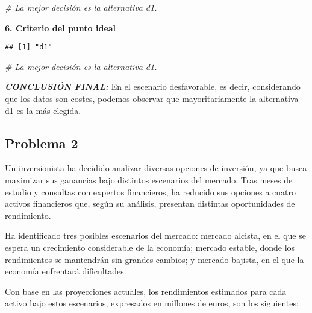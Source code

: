 \documentclass[
]{article}
\newenvironment{Shaded}{\begin{snugshade}}{\end{snugshade}}
\newcommand{\CommentTok}[1]{\textcolor[rgb]{0.56,0.35,0.01}{\textit{#1}}}
\newcommand{\FunctionTok}[1]{\textcolor[rgb]{0.13,0.29,0.53}{\textbf{#1}}}
\newcommand{\NormalTok}[1]{#1}
\newcommand{\OtherTok}[1]{\textcolor[rgb]{0.56,0.35,0.01}{#1}}
\newcommand{\SpecialCharTok}[1]{\textcolor[rgb]{0.81,0.36,0.00}{\textbf{#1}}}
\begin{document}
\begin{Shaded}
\begin{Highlighting}[]
\CommentTok{\# La mejor decisión es la alternativa d1.}
\end{Highlighting}
\end{Shaded}

\textbf{6. Criterio del punto ideal}

\begin{Shaded}
\end{Shaded}

\begin{verbatim}
## [1] "d1"
\end{verbatim}

\begin{Shaded}
\begin{Highlighting}[]
\CommentTok{\# La mejor decisión es la alternativa d1.}
\end{Highlighting}
\end{Shaded}

\textbf{\emph{CONCLUSIÓN FINAL:}} En el escenario desfavorable, es
decir, considerando que los datos son costes, podemos observar que
mayoritariamente la alternativa d1 es la más elegida.

\subsection{Problema 2}\label{problema-2-2}

Un inversionista ha decidido analizar diversas opciones de inversión, ya
que busca maximizar sus ganancias bajo distintos escenarios del mercado.
Tras meses de estudio y consultas con expertos financieros, ha reducido
sus opciones a cuatro activos financieros que, según su análisis,
presentan distintas oportunidades de rendimiento.

Ha identificado tres posibles escenarios del mercado: mercado alcista,
en el que se espera un crecimiento considerable de la economía; mercado
estable, donde los rendimientos se mantendrán sin grandes cambios; y
mercado bajista, en el que la economía enfrentará dificultades.

Con base en las proyecciones actuales, los rendimientos estimados para
cada activo bajo estos escenarios, expresados en millones de euros, son
los siguientes:
\end{document}
